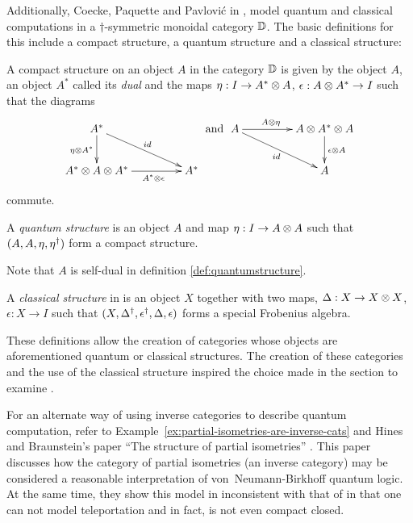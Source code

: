 \begin{remark}
Additionally, Coecke, Paquette and Pavlovi\'c in  \cite{coecke08classical}, model quantum and
classical computations in a $\dagger$-symmetric monoidal category $\mathbb{D}$. The basic definitions for this
include a compact structure, a quantum structure and a classical structure:

\begin{definition}\label{def:compact_structure}
  A compact structure on an object $A$ in the category $\mathbb{D}$ is given by the object $A$, an object
  $A^{*}$ called its \emph{dual} and the maps $\eta:I \to A^{*}\otimes A$, $\epsilon: A\otimes A^{*} \to I$
  such that the diagrams
  \[
    \xymatrix@C+20pt{
      A^{*} \ar[dr]^{id} \ar[d]_{\eta\*A^{*}} \\
      A^{*} \*A\*A^{*}  \ar[r]_(.6){A^{*} \*\epsilon} & A^{*}
    }
    \text{ and }
    \xymatrix@C+20pt{
      A \ar[r]^(.4){A\*\eta} \ar[dr]_{id} & A\* A^{*}\* A \ar[d]^{\epsilon\*A}\\
      & A
    }
  \]
  commute.
\end{definition}

\begin{definition}\label{def:quantumstructure}
  A \emph{quantum structure} is an object $A$ and map $\eta:I\to A\otimes A$ such that
  $(A,A,\eta,{\eta}^{\dagger})$ form a compact structure.
\end{definition}
Note that $A$ is self-dual in definition \ref{def:quantumstructure}.


\begin{definition}\label{def:classicalstructure}
  A \emph{classical structure} in \cD{} is an object $X$ together with two maps, $\Delta :X \to X\otimes X$,
  $\epsilon:X\to I$ such that $(X,{\Delta}^{\dagger},{\epsilon}^{\dagger},\Delta,\epsilon)$ forms a special
  Frobenius algebra.
\end{definition}

These definitions allow the creation of categories whose objects are aforementioned quantum or
classical structures. The creation of these categories and the use of the classical structure
inspired the choice made in the section to examine \CFrob.
\end{remark}

\begin{remark}
  For an alternate way of using inverse categories to describe quantum computation, refer to
  Example~\ref{ex:partial-isometries-are-inverse-cats} and Hines and Braunstein's paper ``The
  structure of partial isometries'' \cite{hines2010structure}. This paper discusses how the category
  of partial isometries (an inverse category) may be considered a reasonable interpretation of
  von~Neumann-Birkhoff quantum logic\cite{birkhoff1936logic}. At the same time, they show this model
  in inconsistent with that of \cite{abramsky04:catsemquantprot} in that one can not model
  teleportation and in fact, is not even compact closed.
\end{remark}



